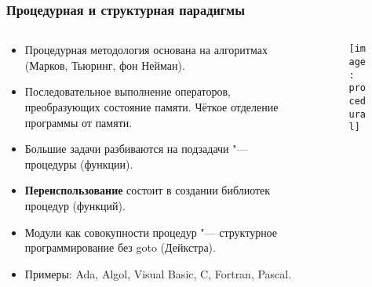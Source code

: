 \documentclass[default]{beamer}
\begin{document}
	\begin{frame}
		\frametitle{Процедурная и структурная парадигмы}
		
		\begin{columns}
			\begin{column}{0.7\textwidth}
				\begin{itemize}
					\item Процедурная методология основана на алгоритмах (Марков, Тьюринг, фон Нейман).
					\item Последовательное выполнение операторов, преобразующих состояние памяти. Чёткое отделение программы от памяти.
					\item Большие задачи разбиваются на подзадачи "--- процедуры (функции).
					\item \textbf{Переиспользование} состоит в создании библиотек процедур (функций).
					\item Модули как совокупности процедур "--- структурное программирование без goto (Дейкстра).
					\item Примеры: Ada, Algol, Visual Basic, C, Fortran, Pascal.
				\end{itemize}				
			\end{column}
			\begin{column}{0.3\textwidth}
				\begin{figure}
					\texttt{[image: procedural]}
				\end{figure}
			\end{column}

		\end{columns}

	\end{frame}
\end{document}
